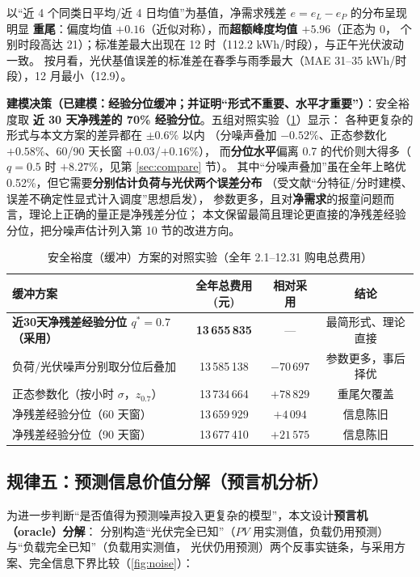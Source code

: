 以“近 4 个同类日平均/近 4 日均值”为基值，净需求残差 $e=e_L-e_P$ 的分布呈现明显
\textbf{重尾}：偏度均值 $+0.16$（近似对称），而\textbf{超额峰度均值 $+5.96$}（正态为 0，
个别时段高达 21）；标准差最大出现在 12 时（112.2 kWh/时段），与正午光伏波动一致。
按月看，光伏基值误差的标准差在春季与雨季最大（MAE 31--35 kWh/时段），12 月最小（12.9）。

\textbf{建模决策（已建模：经验分位缓冲；并证明“形式不重要、水平才重要”）}：安全裕度取
\textbf{近 30 天净残差的 70\% 经验分位}。五组对照实验（\cref{tab:buffer}）显示：
各种更复杂的形式与本文方案的差异都在 $\pm0.6\text{\%}$ 以内
（分噪声叠加 $-0.52\text{\%}$、正态参数化 $+0.58\text{\%}$、60/90 天长窗 $+0.03$/$+0.16\text{\%}$），
而\textbf{分位水平}偏离 0.7 的代价则大得多（$q=0.5$ 时 $+8.27\text{\%}$，见第 \ref{sec:compare} 节）。
其中“分噪声叠加”虽在全年上略优 0.52\%，但它需要\textbf{分别估计负荷与光伏两个误差分布}
（受文献\cite{cqut253,cqut276}“分特征/分时建模、误差不确定性显式计入调度”思想启发），
参数更多，且对\textbf{净需求}的报童问题而言，理论上正确的量正是净残差分位；
本文保留最简且理论更直接的净残差经验分位，把分噪声估计列入第 10 节的改进方向。

\begin{table}[htbp]
\centering
\caption{安全裕度（缓冲）方案的对照实验（全年 2.1--12.31 购电总费用）}
\label{tab:buffer}
\small
\begin{tabular}{@{}lccc@{}}
\toprule
缓冲方案 & 全年总费用(元) & 相对采用 & 结论 \\
\midrule
\textbf{近30天净残差经验分位 $q^*=0.7$（采用）} & \textbf{13\,655\,835} & --- & 最简形式、理论直接 \\
负荷/光伏噪声分别取分位后叠加 & 13\,585\,138 & $-70\,697$ & 参数更多，事后择优 \\
正态参数化（按小时 $\sigma$，$z_{0.7}$） & 13\,734\,664 & $+78\,829$ & 重尾欠覆盖 \\
净残差经验分位（60 天窗） & 13\,659\,929 & $+4\,094$ & 信息陈旧 \\
净残差经验分位（90 天窗） & 13\,677\,410 & $+21\,575$ & 信息陈旧 \\
\bottomrule
\end{tabular}
\end{table}

\subsection{规律五：预测信息价值分解（预言机分析）}

为进一步判断“是否值得为预测噪声投入更复杂的模型”，本文设计\textbf{预言机（oracle）分解}：
分别构造“光伏完全已知”（$PV$ 用实测值，负载仍用预测）与“负载完全已知”（负载用实测值，
光伏仍用预测）两个反事实链条，与采用方案、完全信息下界比较（\cref{fig:noise}）：


